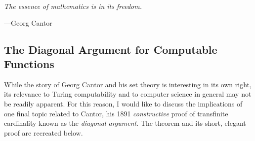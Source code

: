 \begin{center}
	\begin{displayquote}
		\centering
		\textit{The essence of mathematics is in its freedom.}
		\begin{flushright}
		---Georg Cantor
		\end{flushright}
	\end{displayquote}
\end{center}
\vspace{4mm}

\subsection{The Diagonal Argument for Computable Functions}

While the story of Georg Cantor and his set theory is interesting in its own right, its relevance to Turing computability and to computer science in general may not be readily apparent. For this reason, I would like to discuss the implications of one final topic related to Cantor, his 1891 \textit{constructive} proof of transfinite cardinality known as the \textit{diagonal argument}. The theorem and its short, elegant proof are recreated below.

